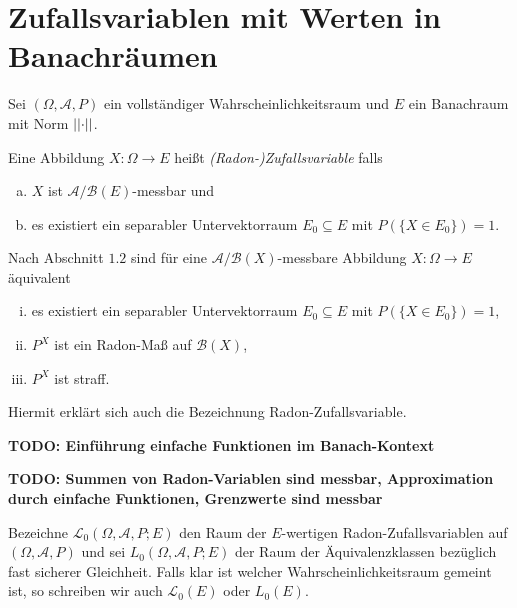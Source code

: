 \section{Zufallsvariablen mit Werten in Banachräumen}
Sei $(\Omega, \mathcal{A}, P)$ ein vollständiger Wahrscheinlichkeitsraum und $E$ ein Banachraum mit Norm $\lvert\lvert \cdot \rvert\rvert$. 
\begin{mydef}
    Eine Abbildung $X: \Omega \to E$ heißt \textit{(Radon-)Zufallsvariable} falls 
    \begin{enumerate}[(a)]
        \item $X$ ist $\mathcal{A}/\mathcal{B}(E)$-messbar und
        \item es existiert ein separabler Untervektorraum $E_0 \subseteq E$ mit $P(\{X \in E_0\}) = 1$. 
    \end{enumerate}
\end{mydef}

\begin{remark}
    Nach Abschnitt $1.2$ sind für eine $\mathcal{A}/\mathcal{B}(X)$-messbare Abbildung $X: \Omega \to E$ äquivalent
    \begin{enumerate}[(i)]
        \item es existiert ein separabler Untervektorraum $E_0 \subseteq E$ mit $P(\{X \in E_0\}) = 1$,
        \item $P^X$ ist ein Radon-Maß auf $\mathcal{B}(X)$, 
        \item $P^X$ ist straff. 
    \end{enumerate}
    Hiermit erklärt sich auch die Bezeichnung Radon-Zufallsvariable. 
\end{remark}

\textbf{TODO: Einführung einfache Funktionen im Banach-Kontext}
\begin{proposition}
    \textbf{TODO: Summen von Radon-Variablen sind messbar, Approximation durch einfache Funktionen, Grenzwerte sind messbar}
\end{proposition}

Bezeichne $\mathcal{L}_0(\Omega, \mathcal{A}, P; E)$ den Raum der $E$-wertigen Radon-Zufallsvariablen auf $(\Omega,\mathcal{A},P)$ und sei $L_0(\Omega, \mathcal{A}, P;E)$ der Raum der Äquivalenzklassen bezüglich fast sicherer Gleichheit. 
Falls klar ist welcher Wahrscheinlichkeitsraum gemeint ist, so schreiben wir auch $\mathcal{L}_0(E)$ oder $L_0(E)$. 

